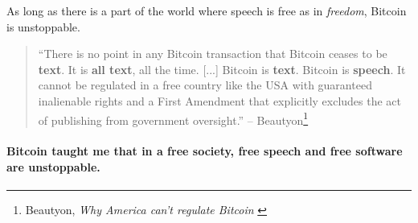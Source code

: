 As long as there is a part of the world where speech is free as in
\textit{freedom}, Bitcoin is unstoppable.

\begin{quotation}
``There is no point in any Bitcoin transaction that Bitcoin ceases to be
\textbf{text}. It is \textbf{all text}, all the time. [...] Bitcoin is
\textbf{text}. Bitcoin is \textbf{speech}. It cannot be regulated in a free
country like the USA with guaranteed inalienable rights and a First Amendment
that explicitly excludes the act of publishing from government oversight.''
\flushright -- Beautyon\footnote{Beautyon, \textit{Why America can't regulate
Bitcoin} \cite{america-regulate-bitcoin}}
\end{quotation}

\paragraph{Bitcoin taught me that in a free society, free speech and free software
are unstoppable.}

%
%
%
%
%
%
%
